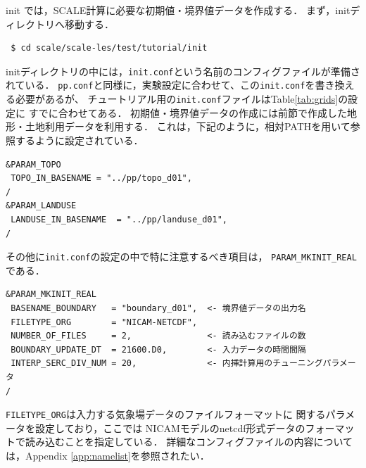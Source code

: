 init では，SCALE計算に必要な初期値・境界値データを作成する．
まず，initディレクトリへ移動する．
\begin{verbatim}
 $ cd scale/scale-les/test/tutorial/init
\end{verbatim}

initディレクトリの中には，\verb|init.conf|という名前のコンフィグファイルが準備されている．
\verb|pp.conf|と同様に，実験設定に合わせて、この\verb|init.conf|を書き換える必要があるが、
チュートリアル用の\verb|init.conf|ファイルはTable\ref{tab:grids}の設定に
すでに合わせてある．
初期値・境界値データの作成には前節で作成した地形・土地利用データを利用する．
これは，下記のように，相対PATHを用いて参照するように設定されている．

\begin{verbatim}
&PARAM_TOPO
 TOPO_IN_BASENAME = "../pp/topo_d01",
/
&PARAM_LANDUSE
 LANDUSE_IN_BASENAME  = "../pp/landuse_d01",
/
\end{verbatim}
その他に\verb|init.conf|の設定の中で特に注意するべき項目は，
\verb|PARAM_MKINIT_REAL|である．

\begin{verbatim}
&PARAM_MKINIT_REAL
 BASENAME_BOUNDARY   = "boundary_d01",  <- 境界値データの出力名
 FILETYPE_ORG        = "NICAM-NETCDF",
 NUMBER_OF_FILES     = 2,               <- 読み込むファイルの数
 BOUNDARY_UPDATE_DT  = 21600.D0,        <- 入力データの時間間隔
 INTERP_SERC_DIV_NUM = 20,              <- 内挿計算用のチューニングパラメータ
/
\end{verbatim}

\verb|FILETYPE_ORG|は入力する気象場データのファイルフォーマットに
関するパラメータを設定しており，ここでは
NICAMモデルのnetcdf形式データのフォーマットで読み込むことを指定している．
詳細なコンフィグファイルの内容については，Appendix \ref{app:namelist}を参照されたい．

